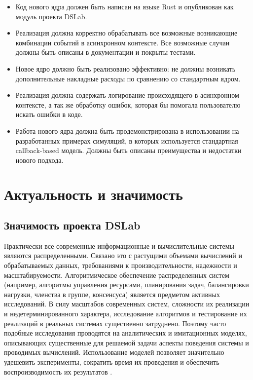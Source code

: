 \begin{itemize}
    \item Код нового ядра должен быть написан на языке Rust и опубликован как модуль проекта DSLab.
    \item Реализация должна корректно обрабатывать все возможные возникающие комбинации событий в асинхронном контексте. Все возможные случаи должны быть описаны в документации и покрыты тестами.
    \item Новое ядро должно быть реализовано эффективно: не должны возникать дополнительные накладные расходы по сравнению со стандартным ядром.
    \item Реализация должна содержать логирование происходящего в асинхронном контексте, а так же обработку ошибок, которая бы помогала пользователю искать ошибки в коде. 
    \item Работа нового ядра должна быть продемонстрирована в использовании на разработанных примерах симуляций, в которых используется стандартная callback-based модель. Должны быть описаны преимущества и недостатки нового подхода.
\end{itemize}

\section{Актуальность и значимость}

\subsection{Значимость проекта DSLab}

Практически все современные информационные и вычислительные системы являются распределенными. Связано это с растущими объемами вычислений и обрабатываемых данных, требованиями к производительности, надежности и масштабируемости. Алгоритмическое обеспечение распределенных систем (например, алгоритмы управления ресурсами, планирования задач, балансировки нагрузки, членства в группе, консенсуса) является предметом активных исследований. В силу масштабов современных систем, сложности их реализации и недетерминированного характера, исследование алгоритмов и тестирование их реализаций в реальных системах существенно затруднено. Поэтому часто подобные исследования проводятся на аналитических и имитационных моделях, описывающих существенные для решаемой задачи аспекты поведения системы и проводимых вычислений. Использование моделей позволяет значительно удешевить эксперименты, сократить время их проведения и обеспечить воспроизводимость их результатов \cite{dslab-description}. 

